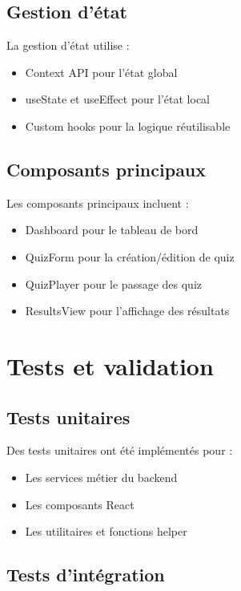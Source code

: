 \documentclass[12pt,a4paper]{report}
\begin{document}
\subsection{Gestion d'état}

La gestion d'état utilise :

\begin{itemize}
    \item Context API pour l'état global
    \item useState et useEffect pour l'état local
    \item Custom hooks pour la logique réutilisable
\end{itemize}

\subsection{Composants principaux}

Les composants principaux incluent :

\begin{itemize}
    \item Dashboard pour le tableau de bord
    \item QuizForm pour la création/édition de quiz
    \item QuizPlayer pour le passage des quiz
    \item ResultsView pour l'affichage des résultats
\end{itemize}

\section{Tests et validation}

\subsection{Tests unitaires}

Des tests unitaires ont été implémentés pour :

\begin{itemize}
    \item Les services métier du backend
    \item Les composants React
    \item Les utilitaires et fonctions helper
\end{itemize}

\subsection{Tests d'intégration}
\end{document}
